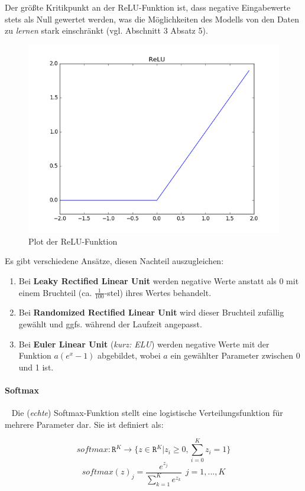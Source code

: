 Der größte Kritikpunkt an der ReLU-Funktion ist, dass negative Eingabewerte stets als Null gewertet werden, was die Möglichkeiten des Modells von den Daten zu \textit{lernen} stark einschränkt (vgl. \cite{sigmoid} Abschnitt 3 Absatz 5). 
\begin{figure}[h]
	\begin{center}
		\includegraphics[width=0.5\linewidth]{Bilder/ReluPlot}
		\caption[Rectified Linear Unit: \newline \tiny\url{
			https://leonardoaraujosantos.gitbooks.io/artificial-inteligence/content/relu_layer.html}\normalsize]{Plot der ReLU-Funktion}
		\label{fig:ReLUplot}
	\end{center}
\end{figure}  
Es gibt verschiedene Ansätze, diesen Nachteil auszugleichen: ~\newline
\begin{enumerate}
	 \item Bei \textbf{Leaky Rectified Linear Unit} werden negative Werte anstatt als 0 mit einem Bruchteil (ca. $\frac{1}{100}$-stel) ihres Wertes behandelt. 
	\item Bei \textbf{Randomized Rectified Linear Unit} wird dieser Bruchteil zufällig gewählt und ggfs. während der Laufzeit angepasst. 
	\item Bei \textbf{Euler Linear Unit} (\textit{kurz: ELU}) werden negative Werte mit der Funktion $a(e^x-1)$ abgebildet,  wobei $a$ ein gewählter Parameter zwischen 0 und 1 ist.
\end{enumerate}
 
\paragraph{Softmax}~\newline
Die (\textit{echte}) Softmax-Funktion stellt eine logistische Verteilungsfunktion für mehrere Parameter dar. Sie ist definiert als: 

\begin{equation}
	\label{eq:Softmax}
	softmax: \mathtt{R}^K \rightarrow \lbrace z \in \mathtt{R}^K | z_i \geq 0 , \sum_{i=0}^{K} z_i = 1 \rbrace
\end{equation}
\begin{equation}
\label{eq:Softmax2}
	softmax(z)_j = \dfrac{e^{z_j}}{\sum_{k=1}^{K}e^{z_k}}  \ \  j = 1, ... , K
\end{equation}

